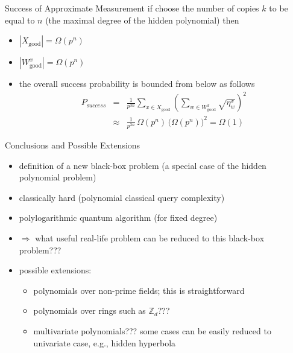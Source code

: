 \documentclass[slideColor]{prosper}
\newcommand{\Z}{{\mathbb{Z}}}
\renewcommand{\>}{\rangle}
\newcommand{\<}{\langle}
\begin{document}

\begin{slide}{Success of Approximate Measurement}
if choose the number of copies $k$ to be equal to $n$ (the maximal degree of the hidden polynomial) then
\begin{itemize}
\item $|X_{\mathrm{good}}|=\Omega(p^n)$
\item $|W_{\mathrm{good}}^x|=\Omega(p^n)$
\item the overall success probability is bounded from below as follows
\begin{eqnarray*}
P_{{\mathrm success}} & = &
\frac{1}{p^{3n}}
\sum_{x \in X_{\mathrm{good}}}
\left( \sum_{w \in W_{\mathrm{good}}^x} \sqrt{\eta^x_w} \right)^2 \\
& \approx & 
\frac{1}{p^{3n}} \,
\Omega(p^n) \, 
\Big(
\Omega(p^n) 
\Big)^2 = \Omega(1)
\end{eqnarray*}
\end{itemize}
\end{slide}


\begin{slide}{Conclusions and Possible Extensions}
\begin{itemize}
\item definition of a new black-box problem (a special case of the hidden polynomial problem)
\item classically hard (polynomial classical query complexity) 
\item polylogarithmic quantum algorithm (for fixed degree)   
\item $\Rightarrow$ what useful real-life problem can be reduced to this black-box problem???
\item possible extensions:
\begin{itemize}
\item polynomials over non-prime fields; this is straightforward
\item polynomials over rings such as $\Z_d$???
\item multivariate polynomials??? some cases can be easily reduced to univariate case, e.g., hidden hyperbola
\end{itemize}
\end{itemize}
\end{slide}

\end{document}
